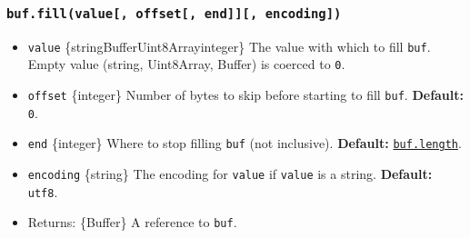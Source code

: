 \begin{Shaded}
\begin{Highlighting}[]
\NormalTok{ \{ }\NormalTok{ \} }\OperatorTok{=} \NormalTok{(}\NormalTok{)}\OperatorTok{;}

\OperatorTok{=} \NormalTok{(}\NormalTok{)}\OperatorTok{;}
\OperatorTok{=} \NormalTok{(}\StringTok{\textquotesingle{}414243\textquotesingle{}}\OperatorTok{,} \NormalTok{)}\OperatorTok{;}
\OperatorTok{=} \NormalTok{(}\NormalTok{)}\OperatorTok{;}

\OperatorTok{;}
\OperatorTok{;}
\end{Highlighting}
\end{Shaded}

\subsubsection{\texorpdfstring{\texttt{buf.fill(value{[},\ offset{[},\ end{]}{]}{[},\ encoding{]})}}{buf.fill(value{[}, offset{[}, end{]}{]}{[}, encoding{]})}}\label{buf.fillvalue-offset-end-encoding}

\begin{itemize}
\tightlist
\item
  \texttt{value}
  \{string\textbar Buffer\textbar Uint8Array\textbar integer\} The value
  with which to fill \texttt{buf}. Empty value (string, Uint8Array,
  Buffer) is coerced to \texttt{0}.
\item
  \texttt{offset} \{integer\} Number of bytes to skip before starting to
  fill \texttt{buf}. \textbf{Default:} \texttt{0}.
\item
  \texttt{end} \{integer\} Where to stop filling \texttt{buf} (not
  inclusive). \textbf{Default:}
  \hyperref[buflength]{\texttt{buf.length}}.
\item
  \texttt{encoding} \{string\} The encoding for \texttt{value} if
  \texttt{value} is a string. \textbf{Default:}
  \texttt{\textquotesingle{}utf8\textquotesingle{}}.
\item
  Returns: \{Buffer\} A reference to \texttt{buf}.
\end{itemize}

